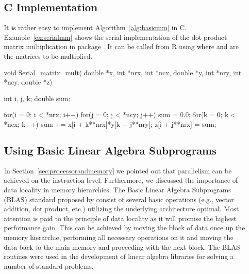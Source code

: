 

\subsection{C Implementation}

It is rather easy to implement Algorithm~\ref{alg:basicmm} in C. 
Example~\ref{ex:serialmm} shows the serial implementation of the dot
product matrix multiplication in package . It can be called
from R using  where  and
 are the matrices to be multiplied.

\begin{Example}
\label{ex:serialmm}
\begin{Scode}
void Serial_matrix_mult( double *x, int *nrx, int *ncx,
			 double *y, int *nry, int *ncy,
			 double *z) {
  int i, j, k;
  double sum;

  for(i = 0; i < *nrx; i++)
    for(j = 0; j < *ncy; j++){
      sum = 0.0;
      for(k = 0; k < *ncx; k++)
	sum += x[i + k**nrx]*y[k + j**nry];
      z[i + j**nrx] = sum;
    }
}
\end{Scode}
\end{Example}

\subsection{Using Basic Linear Algebra Subprograms}
\label{sec:blas}
In Section~\ref{sec:processorandmemory} we pointed out that
parallelism can be achieved on the instruction level. Furthermore, we
discussed  the importance of data locality in memory hierarchies. The
Basic Linear Algebra Subprograms (BLAS) standard proposed by
\cite{lawson79bla} consist of several basic operations (e.g., vector
addition, dot product, etc.) utilizing the underlying architecture
optimal. Most attention is paid to the principle of data locality as
it will promise the highest performance gain. This can be achieved by
moving the block of data once up the memory hierarchie, performing all
necessary operations on it and moving the data back to the main memory
and proceeding with the next block. The BLAS routines were used in the
development of linear algebra libraries for solving a number of
standard problems.

